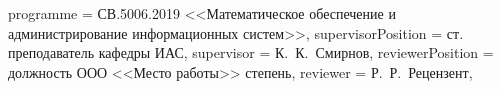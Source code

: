 {	%
	programme          = {СВ.5006.2019 <<Математическое обеспечение и администрирование информационных систем>>},
	supervisorPosition = {ст. преподаватель кафедры ИАС},
	supervisor         = {К.~К.~Смирнов},
	reviewerPosition   = {должность ООО <<Место работы>> степень},
	reviewer           = {Р.~Р.~Рецензент},
}
